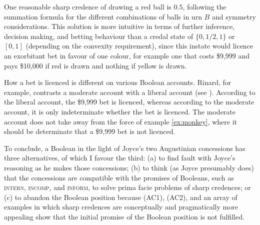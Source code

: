 \documentclass[11pt]{article}
\begin{document}
One reasonable sharp credence of drawing a red ball is $0.5$,
following the summation formula for the different combinations of
balls in urn $B$ and symmetry considerations. This solution is more
intuitive in terms of further inference, decision making, and betting
behaviour than a credal state of $\{0,1/2,1\}$ or $[0,1]$ (depending
on the convexity requirement), since this instate would licence an
exorbitant bet in favour of one colour, for example one that costs
\$9,999 and pays \$10,000 if red is drawn and nothing if yellow is
drawn.

How a bet is licenced is different on various Boolean accounts.
Rinard, for example, contrasts a moderate account with a liberal
account (see ). According to the liberal
account, the \$9,999 bet is licenced, whereas according to the
moderate account, it is only indeterminate whether the bet is
licenced. The moderate account does not take away from the force of
example \ref{ex:monkey}, where it should be determinate that a \$9,999
bet is not licenced.

To conclude, a Boolean in the light of Joyce's two Augustinian
concessions has three alternatives, of which I favour the third: (a)
to find fault with Joyce's reasoning as he makes those concessions;
(b) to think (as Joyce presumably does) that the concessions are
compatible with the promises of Booleans, such as \textsc{intern},
\textsc{incomp}, and \textsc{inform}, to solve prima facie problems of
sharp credences; or (c) to abandon the Boolean position because (AC1),
(AC2), and an array of examples in which sharp credences are
conceptually and pragmatically more appealing show that the initial
promise of the Boolean position is not fulfilled.



\end{document}
